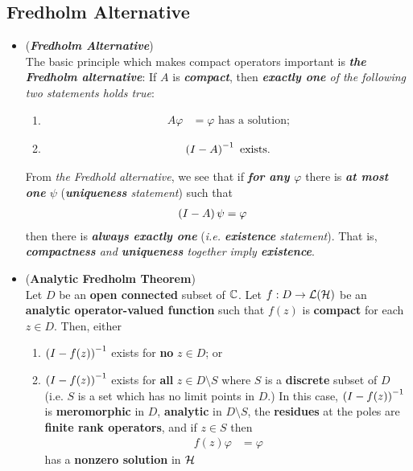 \documentclass[11pt]{article}
\begin{document}
\subsection{Fredholm Alternative}
\begin{itemize}
\item \begin{remark} (\emph{\textbf{Fredholm Alternative}})\\
The basic principle which makes compact operators important is \emph{\textbf{the Fredholm alternative}}: If $A$ is \emph{\textbf{compact}}, then \emph{\textbf{exactly one} of the following two statements holds true}:
\begin{enumerate}
\item 
\begin{align*}
A \varphi&= \varphi \text{ has a solution;}
\end{align*} 
\item 
\begin{align*}
\left(I - A\right)^{-1} \text{ exists.}
\end{align*} 
\end{enumerate}
From \emph{the Fredhold alternative}, we see that if \emph{\textbf{for any $\varphi$}} there is \emph{\textbf{at most one} $\psi$} (\emph{\textbf{uniqueness} statement}) such that
\begin{align*}
\left(I - A\right) \psi &= \varphi 
\end{align*} then there is \emph{\textbf{always exactly one}} (\emph{i.e. \textbf{existence} statement}). That is, \emph{\textbf{compactness} and \textbf{uniqueness}  together imply \textbf{existence}}.
\end{remark}

\item \begin{theorem} (\textbf{Analytic Fredholm Theorem}) \citep{reed1980methods} \\
Let $D$ be an \textbf{open connected} subset of ${\mathbb C}$. Let $f: D \rightarrow {\mathcal L}({\mathcal H})$ be an \textbf{analytic operator-valued function} such that $f(z)$ is \textbf{compact} for each $z \in D$. Then, either 
\begin{enumerate}
\item $\left(I - f(z)\right)^{-1}$  exists for \textbf{no} $z \in D$; or

\item $\left(I - f(z)\right)^{-1}$ exists for \textbf{all} $z \in D \setminus S$ where $S$  is a \textbf{discrete} subset of $D$ (i.e. $S$ is a set which has no limit points in $D$.)
In this case,  $\left(I - f(z)\right)^{-1}$ is \textbf{meromorphic} in $D$, \textbf{analytic} in $D \setminus S$, the \textbf{residues} at the poles are \textbf{finite rank operators}, and if $z \in S$ then
\begin{align*}
f(z)\varphi &= \varphi
\end{align*} has a \textbf{nonzero solution} in ${\mathcal H}$
\end{enumerate}
\end{theorem}


\end{itemize}
\end{document}
